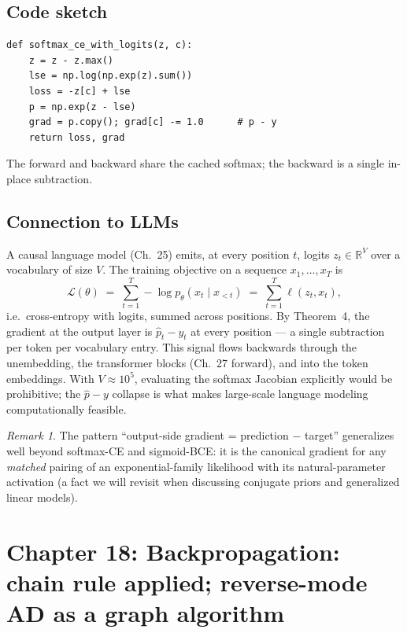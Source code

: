 \documentclass[11pt]{article}
\theoremstyle{remark}
\newtheorem{remark}[theorem]{Remark}
\begin{document}
\subsection*{Code sketch}

\begin{verbatim}
def softmax_ce_with_logits(z, c):
    z = z - z.max()
    lse = np.log(np.exp(z).sum())
    loss = -z[c] + lse
    p = np.exp(z - lse)
    grad = p.copy(); grad[c] -= 1.0      # p - y
    return loss, grad
\end{verbatim}

The forward and backward share the cached softmax; the backward is a single in-place subtraction.

\subsection*{Connection to LLMs}

A causal language model (Ch.~25) emits, at every position $t$, logits $z_t \in \mathbb{R}^V$ over a
vocabulary of size $V$. The training objective on a sequence $x_1, \dots, x_T$ is
\[
\mathcal{L}(\theta) \;=\; \sum_{t=1}^{T} -\log p_\theta(x_t \mid x_{<t}) \;=\; \sum_{t=1}^{T} \ell(z_t, x_t),
\]
i.e.\ cross-entropy with logits, summed across positions. By Theorem~4, the gradient at the output layer is
$\hat p_t - y_t$ at every position --- a single subtraction per token per vocabulary entry. This signal
flows backwards through the unembedding, the transformer blocks (Ch.~27 forward), and into the token
embeddings. With $V \approx 10^5$, evaluating the softmax Jacobian explicitly would be prohibitive; the
$\hat p - y$ collapse is what makes large-scale language modeling computationally feasible.

\begin{remark}
The pattern ``output-side gradient = prediction $-$ target'' generalizes well beyond softmax-CE and
sigmoid-BCE: it is the canonical gradient for any \emph{matched} pairing of an exponential-family likelihood
with its natural-parameter activation (a fact we will revisit when discussing conjugate priors and
generalized linear models).
\end{remark}


\section*{Chapter 18: Backpropagation: chain rule applied; reverse-mode AD as a graph algorithm}
\end{document}
